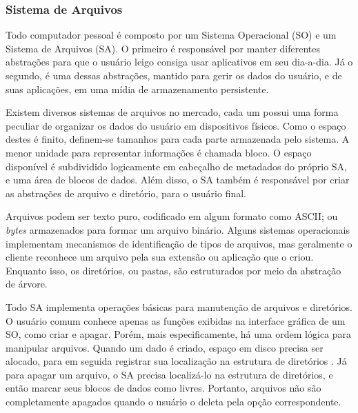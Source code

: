     \subsubsection{Sistema de Arquivos} \label{cap1_visao_geral_sa}
    
    \hspace{1cm}
    Todo computador pessoal é composto por um Sistema Operacional (SO) e um Sistema de Arquivos (SA). O primeiro é responsável por manter diferentes abstrações para que o usuário leigo consiga usar aplicativos em seu dia-a-dia. Já o segundo, é uma dessas abstrações, mantido  para gerir os dados do usuário, e de suas aplicações, em uma mídia de armazenamento persistente.
    
    \vspace{4mm}

    \hspace{1cm}
    Existem diversos sistemas de arquivos no mercado, cada um possui uma forma peculiar de organizar os dados do usuário em dispositivos físicos. Como o espaço destes é finito, definem-se tamanhos para cada parte armazenada pelo sistema. A menor unidade para representar informações é chamada bloco. O espaço disponível é subdividido logicamente em cabeçalho de metadados do próprio SA, e uma área de blocos de dados. Além disso, o SA também é responsável por criar as abstrações de arquivo e diretório, para o usuário final.
    
    \vspace{4mm}
    
    \hspace{1cm}
    Arquivos podem ser texto puro, codificado em algum formato como ASCII; ou \textit{bytes} armazenados para formar um arquivo binário. Alguns sistemas operacionais implementam mecanismos de identificação de tipos de arquivos, mas geralmente o cliente reconhece um arquivo pela sua extensão ou aplicação que o criou. Enquanto isso, os diretórios, ou pastas, são estruturados por meio da abstração de árvore.
    
    \vspace{4mm}
    
    \hspace{1cm}
    Todo SA implementa operações básicas para manutenção de arquivos e diretórios. O usuário comum conhece apenas as funções exibidas na interface gráfica de um SO, como criar e apagar. Porém, mais especificamente, há uma ordem lógica para manipular arquivos. Quando um dado é criado, espaço em disco precisa ser alocado, para em seguida registrar sua localização na estrutura de diretórios \cite{silberschatz2018}. Já para apagar um arquivo, o SA precisa localizá-lo na estrutura de diretórios, e então marcar seus blocos de dados como livres. Portanto, arquivos não são completamente apagados quando o usuário o deleta pela opção correspondente.
    
